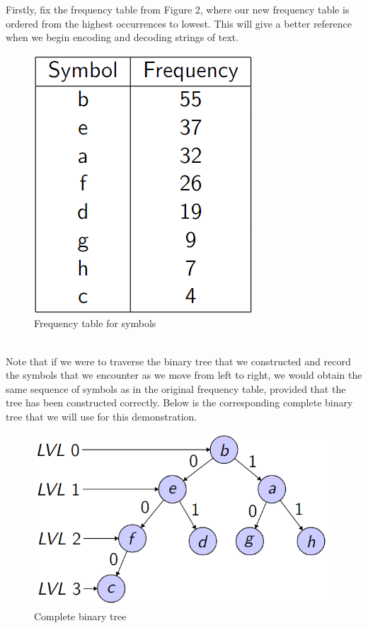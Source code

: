 \documentclass[12pt]{IEEEtran}
\begin{document}
Firstly, fix the frequency table from Figure 2, where our new frequency table is ordered from the highest occurrences to lowest.
This will give a better reference when we begin encoding and decoding strings of text.
\begin{figure}[h]
    \centering
    \includegraphics[scale=0.35]{../presentation/images/freqtbl.png}
    \captionsetup{justification=centering}
    \caption{Frequency table for symbols}
\end{figure}
\\
Note that if we were to traverse the binary tree that we constructed 
and record the symbols that we encounter as we move from left to right, we would obtain the same sequence of symbols as in the original 
frequency table, provided that the tree has been constructed correctly. Below is the corresponding complete binary tree that we will use 
for this demonstration.
\begin{figure}[h]
    \centering
    \includegraphics[scale=0.35]{../presentation/images/bintree.png}
    \captionsetup{justification=centering}
    \caption{Complete binary tree}
\end{figure}
\end{document}
